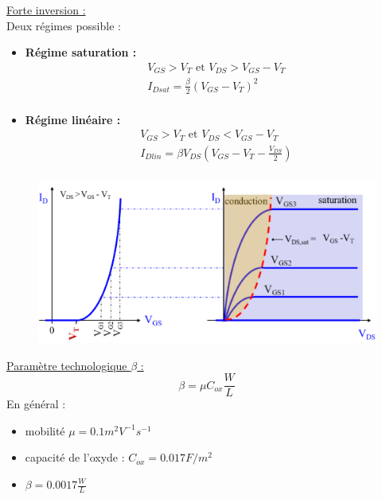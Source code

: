 \documentclass[../main.tex]{subfiles}
\begin{document}
\quad \underline{Forte inversion :}\\

Deux régimes possible : \begin{itemize}
    \item \textbf{Régime saturation :} \begin{equation}
        \begin{gathered}
            V_{GS} >V_T \text{ et } V_{DS} > V_{GS}-V_T\\
            I_{Dsat} = \frac{\beta}{2}(V_{GS}-V_T)^2\\
        \end{gathered}
    \end{equation}
    \item \textbf{Régime linéaire :}\begin{equation}
        \begin{gathered}
            V_{GS} > V_T \text{ et } V_{DS} < V_{GS}-V_T\\
            I_{Dlin} = \beta V_{DS} (V_{GS}-V_T-\frac{V_{DS}}{2})\\
        \end{gathered}
    \end{equation}
\end{itemize}

\begin{figure}
    \centering
    \includegraphics[width=.5\textwidth]{IMAGES/elec/Screenshot from 2023-12-11 13-48-17.png}
\end{figure}

\quad \underline{Paramètre technologique $\beta$ :}\\
\begin{equation}
    \beta = \mu C_{ox} \frac{W}{L}
\end{equation}
En général : \begin{itemize}
    \item mobilité $\mu = 0.1 m^2V^{-1}s^{-1}$\\
    \item capacité de l'oxyde : $C_{ox} = 0.017 F/m^2$\\
    \item $\beta = 0.0017 \frac{W}{L}$\\
\end{itemize}
\end{document}
